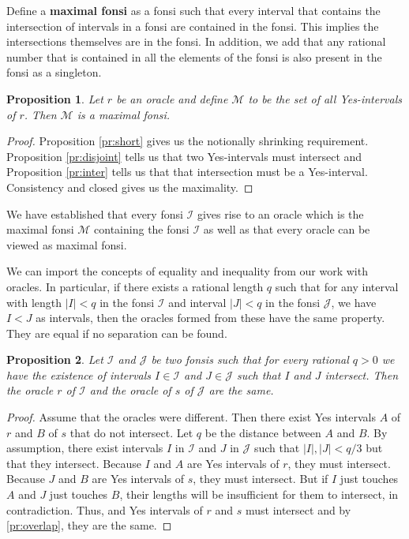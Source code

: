 \documentclass[12pt]{article}
\newtheorem{proposition}{Proposition}
\theoremstyle{remark}
\begin{document}
Define a \textbf{maximal fonsi} as a fonsi such that every interval that contains the intersection of intervals in a fonsi are contained in the fonsi. This implies the intersections themselves are in the fonsi. In addition, we add that any rational number that is contained in all the elements of the fonsi is also present in the fonsi as a singleton. 

\begin{proposition} Let $r$ be an oracle and define $\mathcal{M}$ to be the set of all Yes-intervals of $r$. Then $\mathcal{M}$ is a maximal fonsi. 
\end{proposition}

\begin{proof}
     Proposition \ref{pr:short} gives us the notionally shrinking requirement. Proposition \ref{pr:disjoint} tells us that two Yes-intervals must intersect and Proposition \ref{pr:inter} tells us that that intersection must be a Yes-interval. Consistency and closed gives us the maximality.
\end{proof}

We have established that every fonsi $\mathcal{I}$ gives rise to an oracle which is the maximal fonsi $\mathcal{M}$ containing the fonsi $\mathcal{I}$ as well as that every oracle can be viewed as maximal fonsi.

We can import the concepts of equality and inequality from our work with oracles. In particular, if there exists a rational length $q$ such that for any interval with length $|I|<q$ in the fonsi $\mathcal{I}$ and interval $|J|<q$ in the fonsi $\mathcal{J}$, we have $I  < J$ as intervals, then the oracles formed from these have the same property. They are equal if no separation can be found. 

\begin{proposition}\label{pr:fonsi-inter}
Let $\mathcal{I}$ and $\mathcal{J}$ be two fonsis such that for every rational $q>0$ we have the existence of intervals $I \in \mathcal{I}$ and $J \in \mathcal{J}$ such that $I$ and $J$ intersect. Then the oracle $r$ of $\mathcal{I}$ and the oracle of $s$ of $\mathcal{J}$ are the same. 
\end{proposition}

\begin{proof}
Assume that the oracles were different. Then there exist Yes intervals $A$ of $r$ and $B$ of $s$ that do not intersect. Let $q$ be the distance between $A$ and $B$. By assumption, there exist intervals $I$ in $\mathcal{I}$ and $J$ in $\mathcal{J}$ such that $|I|, |J| < q/3$ but that they intersect. Because $I$ and $A$ are Yes intervals of $r$, they must intersect. Because $J$ and $B$ are Yes intervals of $s$, they must intersect. But if $I$ just touches $A$ and $J$ just touches $B$, their lengths will be insufficient for them to intersect, in contradiction. Thus, and Yes intervals of $r$ and $s$ must intersect and by \ref{pr:overlap}, they are the same.  
\end{proof}
\end{document}
